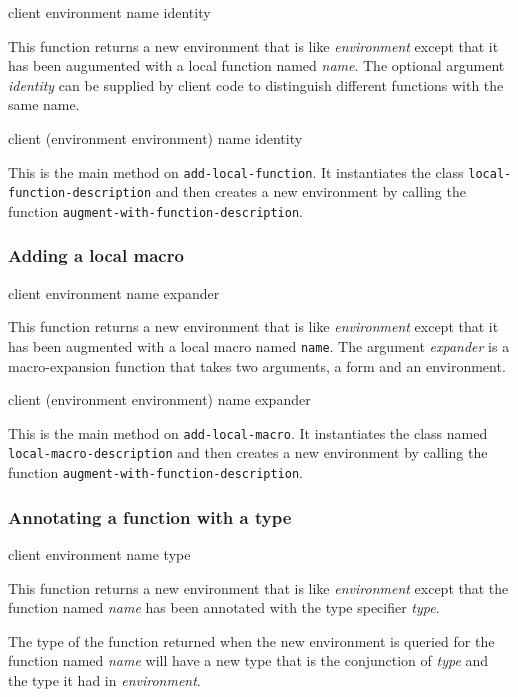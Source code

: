 {\footnotesize
{} {client environment name \optional identity}
}

This function returns a new environment that is like
\textit{environment} except that it has been augumented with a local
function named \textit{name}.  The optional argument \textit{identity}
can be supplied by client code to distinguish different functions with
the same name.

{\footnotesize
{}
{client
 (environment environment)
 name
 \optional identity}
}

This is the main method on \texttt{add-local-function}.  It
instantiates the class \texttt{local-function-description} and then
creates a new environment by calling the function
\texttt{augment-with-function-description}.

\subsubsection{Adding a local macro}

{\footnotesize
{} {client environment name expander}
}

This function returns a new environment that is like
\textit{environment} except that it has been augmented with a local
macro named \texttt{name}.  The argument \textit{expander} is a
macro-expansion function that takes two arguments, a form and an
environment.

{\footnotesize
{} {client (environment environment) name expander}
}

This is the main method on \texttt{add-local-macro}.  It instantiates
the class named \texttt{local-macro-description} and then creates a
new environment by calling the function
\texttt{augment-with-function-description}.

\subsubsection{Annotating a function with a type}
\label{sec-annotating-a-function-with-a-type}

{\footnotesize
{} {client environment name type}
}

This function returns a new environment that is like
\textit{environment} except that the function named \textit{name} has
been annotated with the type specifier \textit{type}.

The type of the function returned when the new environment is queried
for the function named \textit{name} will have a new type that is the
conjunction of \textit{type} and the type it had in
\textit{environment}.

